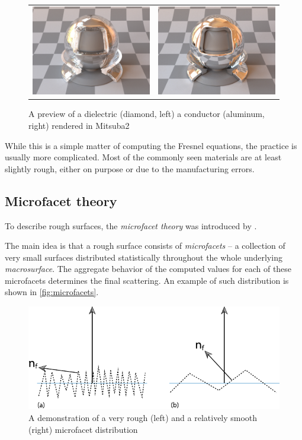 \begin{figure}[h]
	\centering
	\begin{tabular}{cc}
		\includegraphics[width=.4\linewidth]{img/dielectric_diamond.jpg}
		&
		\includegraphics[width=.4\linewidth]{img/conductor_aluminium.jpg}
	\end{tabular}
	\caption{A preview of a dielectric (diamond, left) a conductor (aluminum, right) rendered in Mitsuba2~\cite{mitsubaWeb}}
	\label{fig:compare_dielectric_conductor}
\end{figure}

While this is a simple matter of computing the Fresnel equations, the practice is usually more complicated. Most of the commonly seen materials are at least slightly rough, either on purpose or due to the manufacturing errors.

\subsection{Microfacet theory}
To describe rough surfaces, the \emph{microfacet theory} was introduced by \citet{cook1982reflectance}.

The main idea is that a rough surface consists of \emph{microfacets} -- a collection of very small surfaces distributed statistically throughout the whole underlying \emph{macrosurface}. The aggregate behavior of the computed values for each of these microfacets determines the final scattering. An example of such distribution is shown in \autoref{fig:microfacets}.

\begin{figure}[h]
	\centering
	\includegraphics[width=.8\linewidth]{img/microfacets.pdf}
	\caption{A demonstration of a very rough (left) and a relatively smooth (right) microfacet distribution~\cite{pharr2016physically}}
	\label{fig:microfacets}
\end{figure}


